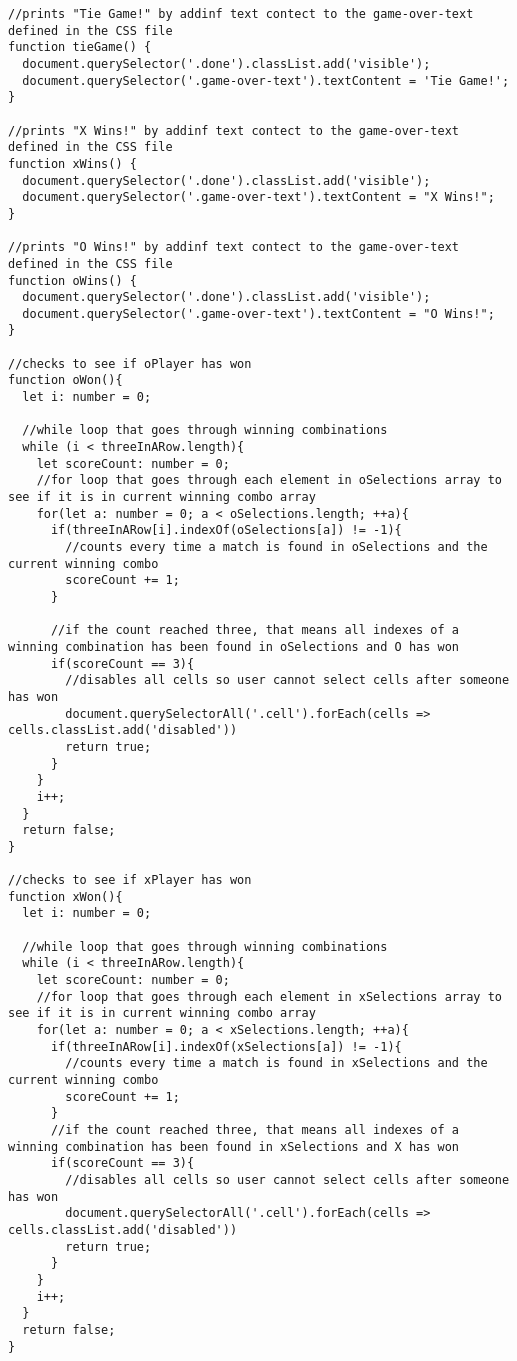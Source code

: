 \documentclass{article}
\theoremstyle{theorem}
\theoremstyle{definition}
\theoremstyle{remark}
\begin{document}
\begin{lstlisting}
//prints "Tie Game!" by addinf text contect to the game-over-text defined in the CSS file
function tieGame() {
  document.querySelector('.done').classList.add('visible');
  document.querySelector('.game-over-text').textContent = 'Tie Game!';
}

//prints "X Wins!" by addinf text contect to the game-over-text defined in the CSS file
function xWins() {
  document.querySelector('.done').classList.add('visible');
  document.querySelector('.game-over-text').textContent = "X Wins!";
}

//prints "O Wins!" by addinf text contect to the game-over-text defined in the CSS file
function oWins() {
  document.querySelector('.done').classList.add('visible');
  document.querySelector('.game-over-text').textContent = "O Wins!";
}

//checks to see if oPlayer has won
function oWon(){
  let i: number = 0;

  //while loop that goes through winning combinations
  while (i < threeInARow.length){
    let scoreCount: number = 0;
    //for loop that goes through each element in oSelections array to see if it is in current winning combo array
    for(let a: number = 0; a < oSelections.length; ++a){
      if(threeInARow[i].indexOf(oSelections[a]) != -1){
        //counts every time a match is found in oSelections and the current winning combo
        scoreCount += 1;
      }

      //if the count reached three, that means all indexes of a winning combination has been found in oSelections and O has won
      if(scoreCount == 3){
        //disables all cells so user cannot select cells after someone has won
        document.querySelectorAll('.cell').forEach(cells => cells.classList.add('disabled'))
        return true;
      }
    }
    i++;
  }
  return false;
}

//checks to see if xPlayer has won
function xWon(){
  let i: number = 0;

  //while loop that goes through winning combinations
  while (i < threeInARow.length){
    let scoreCount: number = 0;
    //for loop that goes through each element in xSelections array to see if it is in current winning combo array
    for(let a: number = 0; a < xSelections.length; ++a){
      if(threeInARow[i].indexOf(xSelections[a]) != -1){
        //counts every time a match is found in xSelections and the current winning combo
        scoreCount += 1;
      }
      //if the count reached three, that means all indexes of a winning combination has been found in xSelections and X has won
      if(scoreCount == 3){
        //disables all cells so user cannot select cells after someone has won
        document.querySelectorAll('.cell').forEach(cells => cells.classList.add('disabled'))
        return true;
      }
    }
    i++;
  }
  return false;
}
\end{lstlisting}
\end{document}
